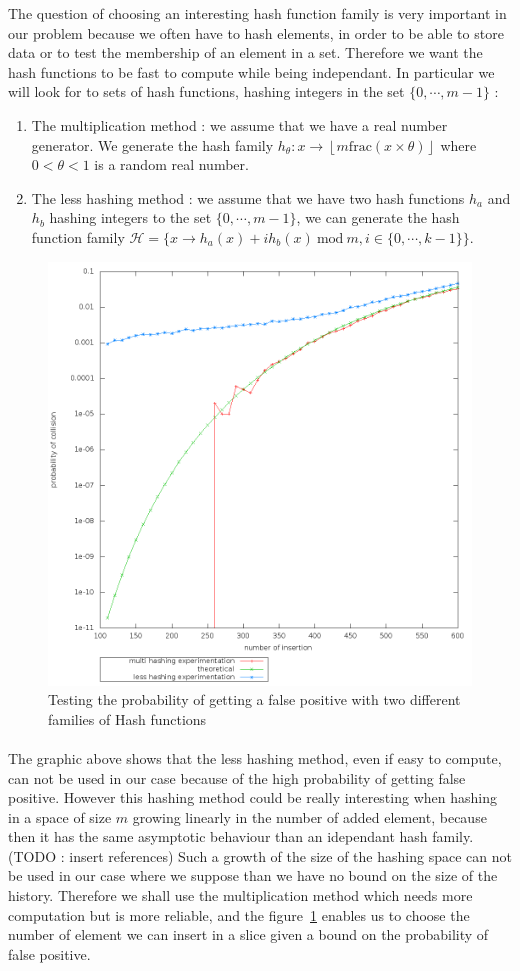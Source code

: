 The question of choosing an interesting hash function family is very important in our problem because we often have to hash elements, in order to be able to store data or to test the membership of an element in a set. Therefore we want the hash functions to be fast to compute while being independant. In particular we will look for to sets of hash functions, hashing integers in the set $\{0,\cdots,m-1\}$ :
\begin{enumerate}
 \item The multiplication method : we assume that we have a real number generator. We generate the hash family $h_{\theta} :  x \rightarrow \left \lfloor m \mathrm{frac}(x\times \theta) \right \rfloor$ where $0<\theta<1$ is a random real number.
 \item The less hashing method : we assume that we have two hash functions $h_a$ and $h_b$ hashing integers to the set $\{0,\cdots,m-1\}$, we can generate the hash function family $\mathcal{H} = \{
 x \rightarrow h_a(x) + i h_b(x) 
 \mathrm{\ mod\ } m
 , i \in 
 \{0,\cdots,k-1\} 
 \}$.
\end{enumerate}

\begin{figure}[H]
\centering
 \includegraphics[width = 0.5\linewidth]{./image/bf/false_positive_probability.png}
 \caption{Testing the probability of getting a false positive with two different families of Hash functions} \label{fig:fpp}
\end{figure}
\paragraph{} The graphic above shows that the less hashing method, even if easy to compute, can not be used in our case because of the high probability of getting false positive. However this hashing method could be really interesting when hashing in a space of size $m$ growing linearly in the number of added element, because then it has the same asymptotic behaviour than an idependant hash family.(TODO : insert references) Such a growth of the size of the hashing space can not be used in our case where we suppose than we have no bound on the size of the history. Therefore we shall use the multiplication method which needs more computation but is more reliable, and the figure~\ref{fig:fpp} enables us to choose the number of element we can insert in a slice given a bound on the probability of false positive.